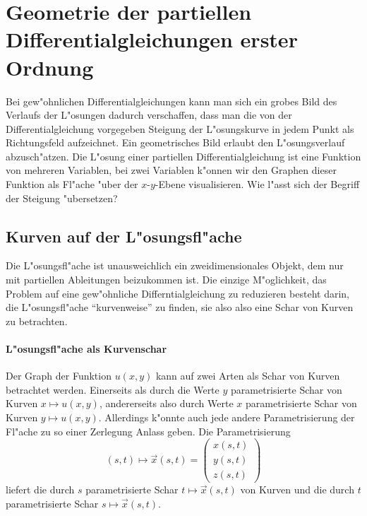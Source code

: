 %
%
%
\chapter{Geometrie der partiellen Differentialgleichungen erster Ordnung\label{chapter-geometrie}}
Bei gew"ohnlichen Differentialgleichungen kann man sich ein grobes
Bild des Verlaufs der L"osungen dadurch verschaffen, dass man
die von der Differentialgleichung vorgegeben Steigung der L"osungskurve
in jedem Punkt als Richtungsfeld aufzeichnet. Ein geometrisches
Bild erlaubt den L"osungsverlauf abzusch"atzen. Die L"osung einer
partiellen Differentialgleichung ist eine Funktion von mehreren Variablen,
bei zwei Variablen k"onnen wir den Graphen dieser Funktion als Fl"ache
"uber der $x$-$y$-Ebene visualisieren. Wie l"asst sich der Begriff der
Steigung "ubersetzen?

\section{Kurven auf der L"osungsfl"ache}
Die L"osungsfl"ache ist unausweichlich ein zweidimensionales
Objekt, dem nur mit partiellen Ableitungen beizukommen ist.
Die einzige M"oglichkeit, das Problem auf eine gew"ohnliche
Differntialgleichung zu reduzieren besteht darin, die L"osungsfl"ache
``kurvenweise'' zu finden, sie also also eine Schar von Kurven
zu betrachten.

\subsubsection{L"osungsfl"ache als Kurvenschar}
Der Graph der Funktion $u(x,y)$ kann auf zwei Arten als Schar von
Kurven betrachtet werden. Einerseits als durch die Werte $y$
parametrisierte Schar von Kurven $x\mapsto u(x,y)$, andererseits
also durch Werte $x$ parametrisierte Schar von Kurven $y\mapsto u(x,y)$.
Allerdings k"onnte auch jede andere Parametrisierung der Fl"ache
zu so einer Zerlegung Anlass geben. Die Parametrisierung
\begin{equation}
(s,t)\mapsto \vec x(s,t)
=
\begin{pmatrix}x(s,t)\\y(s,t)\\z(s,t)\end{pmatrix}
\label{quasilinear:kurvenschar}
\end{equation}
liefert die durch $s$ parametrisierte Schar $t\mapsto \vec x(s,t)$
von Kurven und die durch $t$ parametrisierte Schar $s\mapsto\vec x(s,t)$.

